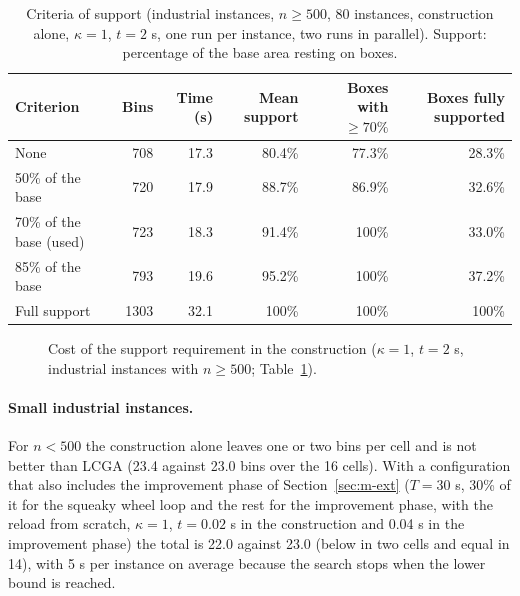 \begin{table}[t]
\centering
\small\setlength{\tabcolsep}{4pt}
\caption{Criteria of support (industrial instances, $n\ge 500$, 80 instances, construction alone, $\kappa=1$, $t=2$ s, one run per instance, two runs in parallel). Support: percentage of the base area resting on boxes.}
\label{tab:e-support}
\begin{tabular}{@{}lrrrrr@{}}
\toprule
Criterion & Bins & Time (s) & Mean support & Boxes with $\ge 70\%$ & Boxes fully supported\\
\midrule
None & 708 & 17.3 & 80.4\% & 77.3\% & 28.3\%\\
50\% of the base & 720 & 17.9 & 88.7\% & 86.9\% & 32.6\%\\
70\% of the base (used) & 723 & 18.3 & 91.4\% & 100\% & 33.0\%\\
85\% of the base & 793 & 19.6 & 95.2\% & 100\% & 37.2\%\\
Full support & 1303 & 32.1 & 100\% & 100\% & 100\%\\
\bottomrule
\end{tabular}
\end{table}

\begin{figure}[t]
\centering
{}
\caption{Cost of the support requirement in the construction ($\kappa=1$, $t=2$ s, industrial instances with $n\ge 500$; Table~\ref{tab:e-support}).}
\label{fig:e-support}
\end{figure}

\paragraph{Small industrial instances.}
For $n<500$ the construction alone leaves one or two bins per cell and is not better than LCGA (23.4 against 23.0 bins over the 16 cells). With a configuration that also includes the improvement phase of Section~\ref{sec:m-ext}
($T=30$ s, 30\% of it for the squeaky wheel loop and the rest for the improvement phase, with the reload from scratch, $\kappa=1$,
$t=0.02$ s in the construction and 0.04 s in the improvement phase) the total is 22.0 against 23.0 (below in two cells and equal in 14), with 5 s per instance on average because the search stops when the lower bound is reached.

